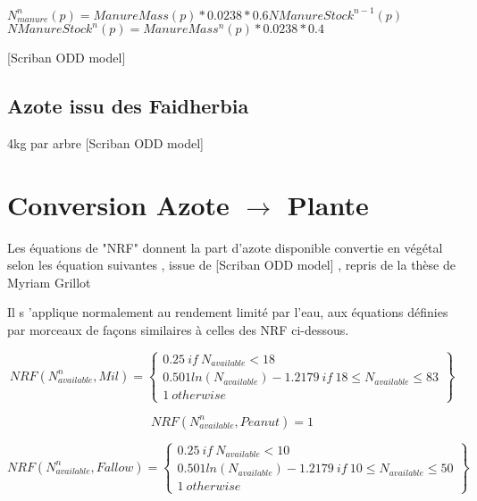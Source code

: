 \documentclass[10pt,a4paper,french]{article} %
\begin{document}
$N_{manure}^n(p)= ManureMass(p) * 0.0238 * 0.6 NManureStock^{n-1}(p)$
$NManureStock^{n}(p) = ManureMass^n(p)*  0.0238 * 0.4 $




[Scriban ODD model]




\subsection{Azote issu des Faidherbia}


4kg par arbre [Scriban ODD model]





\section{Conversion Azote $\rightarrow$ Plante}



Les équations de "NRF" donnent la part d'azote disponible convertie en végétal selon les équation suivantes , issue de [Scriban ODD model]  , repris de la thèse de Myriam Grillot 


Il s 'applique normalement au rendement limité par l'eau,  aux équations définies par morceaux de façons similaires à celles des NRF  ci-dessous. 

\begin{equation}
  NRF(N_{available}^n,Mil)=\left\{
                \begin{array}{ll}
                  0.25 \ if \ N_{available} < 18\\
                0.501 ln(N_{available})-1.2179 \ if \ 18 \leq N_{available} \leq 83  \\
                  1 \ otherwise
                \end{array}
              \right\} 
 \end{equation} 

\begin{equation}
   NRF(N_{available}^n,Peanut)=1
  \end{equation} 
 

 \begin{equation}
   NRF(N_{available}^n,Fallow)=\left\{
                \begin{array}{ll}
                  0.25 \ if \ N_{available} < 10\\
                0.501 ln(N_{available})-1.2179 \ if \ 10 \leq N_{available} \leq 50  \\
                  1 \ otherwise
                \end{array}
              \right\}
  \end{equation} 
  
\end{document}

